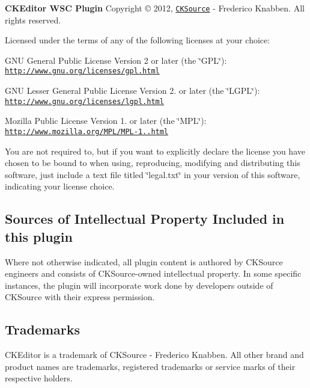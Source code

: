{\bfseries C\+K\+Editor W\+SC Plugin} Copyright \copyright{} 2012, \href{http://cksource.com}{\tt C\+K\+Source} -\/ Frederico Knabben. All rights reserved.

Licensed under the terms of any of the following licenses at your choice\+:


\begin{DoxyItemize}
\item G\+NU General Public License Version 2 or later (the \char`\"{}\+G\+P\+L\char`\"{})\+: \href{http://www.gnu.org/licenses/gpl.html}{\tt http\+://www.\+gnu.\+org/licenses/gpl.\+html}
\item G\+NU Lesser General Public License Version 2. or later (the \char`\"{}\+L\+G\+P\+L\char`\"{})\+: \href{http://www.gnu.org/licenses/lgpl.html}{\tt http\+://www.\+gnu.\+org/licenses/lgpl.\+html}
\item Mozilla Public License Version 1. or later (the \char`\"{}\+M\+P\+L\char`\"{})\+: \href{http://www.mozilla.org/MPL/MPL-1.1.html}{\tt http\+://www.\+mozilla.\+org/\+M\+P\+L/\+M\+P\+L-\/1..\+html}
\end{DoxyItemize}

You are not required to, but if you want to explicitly declare the license you have chosen to be bound to when using, reproducing, modifying and distributing this software, just include a text file titled \char`\"{}legal.\+txt\char`\"{} in your version of this software, indicating your license choice.

\subsection*{Sources of Intellectual Property Included in this plugin }

Where not otherwise indicated, all plugin content is authored by C\+K\+Source engineers and consists of C\+K\+Source-\/owned intellectual property. In some specific instances, the plugin will incorporate work done by developers outside of C\+K\+Source with their express permission.

\subsection*{Trademarks }

C\+K\+Editor is a trademark of C\+K\+Source -\/ Frederico Knabben. All other brand and product names are trademarks, registered trademarks or service marks of their respective holders. 